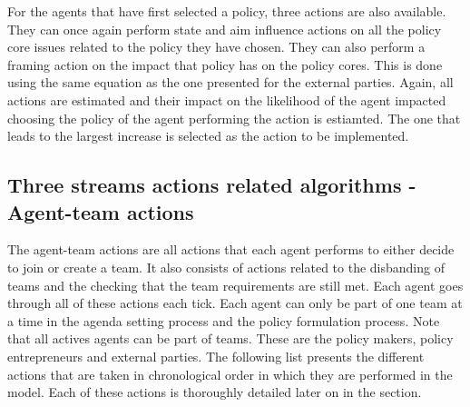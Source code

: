 For the agents that have first selected a policy, three actions are also available. They can once again perform state and aim influence actions on all the policy core issues related to the policy they have chosen. They can also perform a framing action on the impact that policy has on the policy cores. This is done using the same equation as the one presented for the external parties. Again, all actions are estimated and their impact on the likelihood of the agent impacted choosing the policy of the agent performing the action is estiamted. The one that leads to the largest increase is selected as the action to be implemented.

\subsection{Three streams actions related algorithms - Agent-team actions}

The agent-team actions are all actions that each agent performs to either decide to join or create a team. It also consists of actions related to the disbanding of teams and the checking that the team requirements are still met. Each agent goes through all of these actions each tick. Each agent can only be part of one team at a time in the agenda setting process and the policy formulation process. Note that all actives agents can be part of teams. These are the policy makers, policy entrepreneurs and external parties. The following list presents the different actions that are taken in chronological order in which they are performed in the model. Each of these actions is thoroughly detailed later on in the section.

